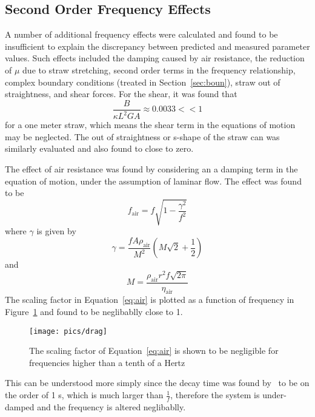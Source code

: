 \documentclass[twoside]{article}
\begin{document}
\begin{multicols}{2}


\section{Second Order Frequency Effects}
A number of additional frequency effects were calculated and found to be insufficient to explain the discrepancy between predicted and measured parameter values. Such effects included the damping caused by air resistance, the reduction of $\mu$ due to straw stretching, second order terms in the frequency relationship, complex boundary conditions (treated in Section~\ref{sec:boun}), straw out of straightness, and shear forces. For the shear, it was found that
\begin{equation}
	\frac{B}{\kappa L^2 G A}\approx 0.0033 << 1
\end{equation}
for a one meter straw, which means the shear term in the equations of motion may be neglected. The out of straightness or s-shape of the straw can was similarly evaluated and also found to close to zero. 


 The effect of air resistance was found by considering an a damping term in the equation of motion, under the assumption of laminar flow.  The effect was found to be
\begin{equation}
	f_\text{air} = f\sqrt{1 - \frac{\gamma^2}{f^2}}
	\label{eq:air}
\end{equation}
where $\gamma$ is given by
\begin{equation}
\gamma = \frac{f A \rho_\text{air}}{M^2} (M  \sqrt{2} +  \frac{1}{2}  )
\end{equation}
and 
\begin{equation}
	M = \frac{\rho_\text{air} r^2 f \sqrt{2\pi} }{\eta_\text{air}}
\end{equation}
The scaling factor in Equation~\ref{eq:air} is plotted as a function of frequency in Figure~\ref{fig:drag} and found to be neglibablly close to 1. 
\begin{figure}[H]
	\texttt{[image: pics/drag]}
	\caption{The scaling factor of Equation~\ref{eq:air} is shown to be negligible for frequencies higher than a tenth of a Hertz}
	\label{fig:drag}
\end{figure}
This can be understood more simply since the decay time was found by~\cite{david} to be on the order of 1 s, which is much larger than $\frac{1}{f}$, therefore the system is under-damped and the frequency is altered neglibablly. 


\end{multicols}
\end{document}
